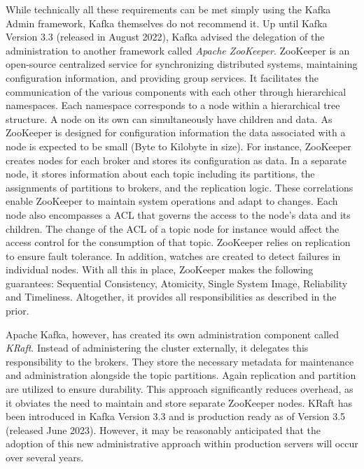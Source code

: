While technically all these requirements can be met simply using the Kafka Admin framework, Kafka themselves do not recommend it. Up until Kafka Version 3.3 (released in August 2022), Kafka advised the delegation of the administration to another framework called \textit{Apache ZooKeeper}. ZooKeeper is an open-source centralized service for synchronizing distributed systems, maintaining configuration information, and providing group services. It facilitates the communication of the various components with each other through hierarchical namespaces. Each namespace corresponds to a node within a hierarchical tree structure. A node on its own can simultaneously have children and data. As ZooKeeper is designed for configuration information the data associated with a node is expected to be small (Byte to Kilobyte in size). For instance, ZooKeeper creates nodes for each broker and stores its configuration as data. In a separate node, it stores information about each topic including its partitions, the assignments of partitions to brokers, and the replication logic. These correlations enable ZooKeeper to maintain system operations and adapt to changes. Each node also encompasses a \ac{ACL} that governs the access to the node's data and its children. The change of the ACL of a topic node for instance would affect the access control for the consumption of that topic. ZooKeeper relies on replication to ensure fault tolerance. In addition, watches are created to detect failures in individual nodes. With all this in place, ZooKeeper makes the following guarantees: Sequential Consistency, Atomicity, Single System Image, Reliability and Timeliness. Altogether, it provides all responsibilities as described in the prior.\par
Apache Kafka, however, has created its own administration component called \textit{KRaft}. Instead of administering the cluster externally, it delegates this responsibility to the brokers. They store the necessary metadata for maintenance and administration alongside the topic partitions. Again replication and partition are utilized to ensure durability. This approach significantly reduces overhead, as it obviates the need to maintain and store separate ZooKeeper nodes. KRaft has been introduced in Kafka Version 3.3 and is production ready as of Version 3.5 (released June 2023). However, it may be reasonably anticipated that the adoption of this new administrative approach within production servers will occur over several years.



